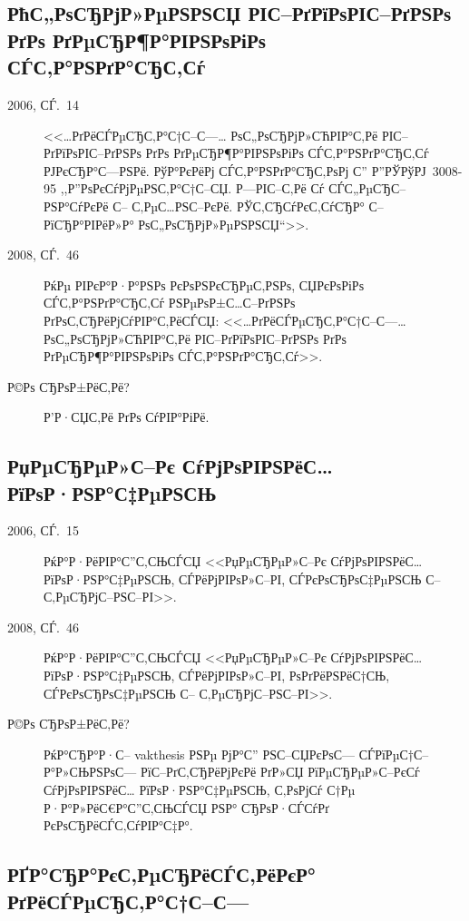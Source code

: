 \documentclass[a4paper]{article}
\newcommand{\vakthesis}{\textsf{vakthesis}}
\begin{document}
\subsection{РћС„РѕСЂРјР»РµРЅРЅСЏ РІС–РґРїРѕРІС–РґРЅРѕ РґРѕ РґРµСЂР¶Р°РІРЅРѕРіРѕ СЃС‚Р°РЅРґР°СЂС‚Сѓ}

\begin{description}
\item[2006, СЃ.~14] <<\ldots{}РґРёСЃРµСЂС‚Р°С†С–С—\ldots{} РѕС„РѕСЂРјР»СЋРІР°С‚Рё РІС–РґРїРѕРІС–РґРЅРѕ
  РґРѕ РґРµСЂР¶Р°РІРЅРѕРіРѕ СЃС‚Р°РЅРґР°СЂС‚Сѓ РЈРєСЂР°С—РЅРё. РўР°РєРёРј СЃС‚Р°РЅРґР°СЂС‚РѕРј С” Р”РЎРўРЈ~3008-95
  ,,Р”РѕРєСѓРјРµРЅС‚Р°С†С–СЏ. Р—РІС–С‚Рё Сѓ СЃС„РµСЂС– РЅР°СѓРєРё С– С‚РµС…РЅС–РєРё. РЎС‚СЂСѓРєС‚СѓСЂР° С– РїСЂР°РІРёР»Р°
  РѕС„РѕСЂРјР»РµРЅРЅСЏ``>>.

\item[2008, СЃ.~46] РќРµ РІРєР°Р·Р°РЅРѕ РєРѕРЅРєСЂРµС‚РЅРѕ, СЏРєРѕРіРѕ СЃС‚Р°РЅРґР°СЂС‚Сѓ РЅРµРѕР±С…С–РґРЅРѕ
  РґРѕС‚СЂРёРјСѓРІР°С‚РёСЃСЏ: <<\ldots{}РґРёСЃРµСЂС‚Р°С†С–С—\ldots{} РѕС„РѕСЂРјР»СЋРІР°С‚Рё РІС–РґРїРѕРІС–РґРЅРѕ
  РґРѕ РґРµСЂР¶Р°РІРЅРѕРіРѕ СЃС‚Р°РЅРґР°СЂС‚Сѓ>>.

\item[Р©Рѕ СЂРѕР±РёС‚Рё?] Р’Р·СЏС‚Рё РґРѕ СѓРІР°РіРё.
\end{description}

\subsection{РџРµСЂРµР»С–Рє СѓРјРѕРІРЅРёС… РїРѕР·РЅР°С‡РµРЅСЊ}

\begin{description}
\item[2006, СЃ.~15] РќР°Р·РёРІР°С”С‚СЊСЃСЏ <<РџРµСЂРµР»С–Рє СѓРјРѕРІРЅРёС… РїРѕР·РЅР°С‡РµРЅСЊ, СЃРёРјРІРѕР»С–РІ,
  СЃРєРѕСЂРѕС‡РµРЅСЊ С– С‚РµСЂРјС–РЅС–РІ>>.

\item[2008, СЃ.~46] РќР°Р·РёРІР°С”С‚СЊСЃСЏ <<РџРµСЂРµР»С–Рє СѓРјРѕРІРЅРёС… РїРѕР·РЅР°С‡РµРЅСЊ, СЃРёРјРІРѕР»С–РІ,
  РѕРґРёРЅРёС†СЊ, СЃРєРѕСЂРѕС‡РµРЅСЊ С– С‚РµСЂРјС–РЅС–РІ>>.

\item[Р©Рѕ СЂРѕР±РёС‚Рё?] РќР°СЂР°Р·С– \vakthesis{} РЅРµ РјР°С” РЅС–СЏРєРѕС— СЃРїРµС†С–Р°Р»СЊРЅРѕС—
  РїС–РґС‚СЂРёРјРєРё РґР»СЏ РїРµСЂРµР»С–РєСѓ СѓРјРѕРІРЅРёС… РїРѕР·РЅР°С‡РµРЅСЊ, С‚РѕРјСѓ С†Рµ Р·Р°Р»РёС€Р°С”С‚СЊСЃСЏ РЅР°
  СЂРѕР·СЃСѓРґ РєРѕСЂРёСЃС‚СѓРІР°С‡Р°.
\end{description}

\subsection{РҐР°СЂР°РєС‚РµСЂРёСЃС‚РёРєР° РґРёСЃРµСЂС‚Р°С†С–С—}
\end{document}
